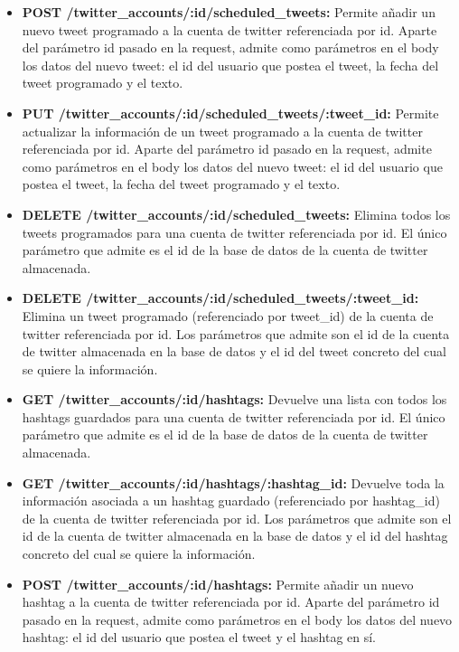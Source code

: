 \documentclass[a4paper]{article}
\begin{document}
\begin{itemize}
		\item \textbf{POST /twitter\_accounts/:id/scheduled\_tweets:} Permite añadir un nuevo tweet programado a la cuenta de twitter referenciada por id. Aparte del parámetro id pasado en la request, admite como parámetros en el body los datos del nuevo tweet: el id del usuario que postea el tweet, la fecha del tweet programado y el texto.
		
		\item \textbf{PUT /twitter\_accounts/:id/scheduled\_tweets/:tweet\_id:} Permite actualizar la información de un tweet programado a la cuenta de twitter referenciada por id. Aparte del parámetro id pasado en la request, admite como parámetros en el body los datos del nuevo tweet: el id del usuario que postea el tweet, la fecha del tweet programado y el texto.
		
		\item \textbf{DELETE /twitter\_accounts/:id/scheduled\_tweets:} Elimina todos los tweets programados para una cuenta de twitter referenciada por id. El único parámetro que admite es el id de la base de datos de la cuenta de twitter almacenada.
		
		\item \textbf{DELETE /twitter\_accounts/:id/scheduled\_tweets/:tweet\_id:} Elimina un tweet programado (referenciado por tweet\_id) de la cuenta de twitter referenciada por id. Los parámetros que admite son el id de la cuenta de twitter almacenada en la base de datos y el id del tweet concreto del cual se quiere la información.
		
		\item \textbf{GET /twitter\_accounts/:id/hashtags:} Devuelve una lista con todos los hashtags guardados para una cuenta de twitter referenciada por id. El único parámetro que admite es el id de la base de datos de la cuenta de twitter almacenada.
		
		\item \textbf{GET /twitter\_accounts/:id/hashtags/:hashtag\_id:} Devuelve toda la información asociada a un hashtag guardado (referenciado por hashtag\_id) de la cuenta de twitter referenciada por id. Los parámetros que admite son el id de la cuenta de twitter almacenada en la base de datos y el id del hashtag concreto del cual se quiere la información.
		
		\item \textbf{POST /twitter\_accounts/:id/hashtags:} Permite añadir un nuevo hashtag a la cuenta de twitter referenciada por id. Aparte del parámetro id pasado en la request, admite como parámetros en el body los datos del nuevo hashtag: el id del usuario que postea el tweet y el hashtag en sí.
		

\end{itemize}
\end{document}
